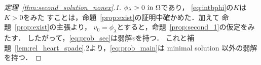 \begin{proof}[定理~\ref{thm:second_solution_nonex}.1]
 $\phi_\lambda > 0 ~\text{in}~ \Omega$であり，
 \eqref{eq:intbphi}の$K$は$K > 0$をみた
 すことは，命題~\ref{prop:exist}の証明中確かめた．加えて
 命題~\ref{prop:exist}の主張より，
 $v_0 = \phi_\lambda$とすると，命題~\ref{prop:second_1}の仮定をみたす．
 したがって，\ref{eq:prob_sec}は弱解$v$を持つ．
 これと補題~\ref{lem:rel_heart_spade}.2より，\ref{eq:prob_main}は
 minimal solution 以外の弱解を持つ． \qedhere
\end{proof}


